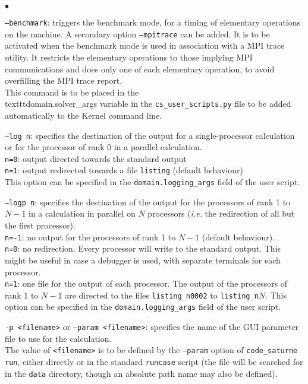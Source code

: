 {{{\begin{list}{$\bullet$}{}
\item \texttt{--benchmark}: triggers the benchmark mode, for a timing
of elementary operations on the machine. A secondary option
\texttt{--mpitrace} can be added. It is to be activated when the benchmark mode
is used in association with a MPI trace utility. It restricts the elementary
operations to those implying MPI communications and does only one of each
elementary operation, to avoid overfilling the MPI trace report.\\
This command is to be placed in the \\texttt{domain.solver\_args} variable
in the \texttt{cs\_user\_scripts.py} file to be added automatically to the
Kernel command line.

\item \texttt{--log n}: specifies the destination of the output for a
single-processor calculation or for the processor of rank 0 in a parallel
calculation.\\
\hspace*{0.5cm}\texttt{n=0}: output directed towards the standard output\\
\hspace*{0.5cm}\texttt{n=1}: output redirected towards a file \texttt{listing}
(default behaviour)\\
This option can be specified in the \texttt{domain.logging\_args} field
of the user script.

\item \texttt{--logp n}: specifies the destination of the output for the
processors of rank 1 to $N-1$ in a calculation in parallel on $N$ processors
({\em i.e.} the redirection of all but the first processor).\\
\hspace*{0.5cm}\texttt{n=-1}: no output for the processors of rank 1 to $N-1$
(default behaviour).\\
\hspace*{0.5cm}\texttt{n=0}: no redirection. Every processor will write to the
standard output. This might be useful in case a debugger is used, with separate
terminals for each processor.\\
\hspace*{0.5cm}\texttt{n=1}: one file for the output of each processor. The
output of the processors of rank 1 to $N-1$ are directed to the files
\texttt{listing\_n0002} to \texttt{listing\_n$N$}.
This option can be specified in the \texttt{domain.logging\_args} field
of the user script.

\item \texttt{-p <filename>} or \texttt{--param <filename>}: specifies the name of the GUI
parameter file to use for the calculation.\\
The value of \texttt{<filename>} is to be defined by the \texttt{--param} option
of \texttt{code\_saturne run}, either directly or in the standard \texttt{runcase}
script (the file will be searched for in the \texttt{data} directory, though
an absolute path name may also be defined).


\end{list}}}}
